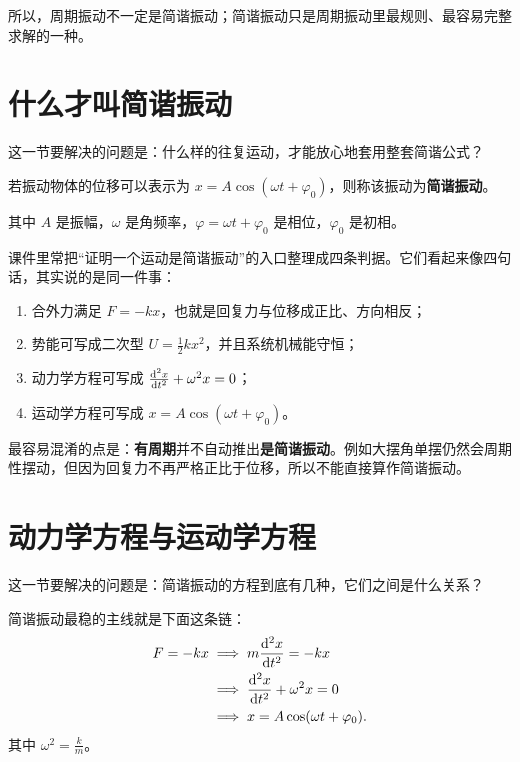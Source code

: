\documentclass[lang=cn,11pt]{elegantbook}
\begin{document}
所以，周期振动不一定是简谐振动；简谐振动只是周期振动里最规则、最容易完整求解的一种。

\section{什么才叫简谐振动}

这一节要解决的问题是：什么样的往复运动，才能放心地套用整套简谐公式？

\begin{definition}[简谐振动]\label{def:simple-harmonic-motion}
若振动物体的位移可以表示为 \(x=A\cos(\omega t+\varphi_0)\)，则称该振动为\textbf{简谐振动}。
\end{definition}

其中 \(A\) 是振幅，\(\omega\) 是角频率，\(\varphi=\omega t+\varphi_0\) 是相位，\(\varphi_0\) 是初相。

课件里常把“证明一个运动是简谐振动”的入口整理成四条判据。它们看起来像四句话，其实说的是同一件事：
\begin{enumerate}
  \item 合外力满足 \(F=-kx\)，也就是回复力与位移成正比、方向相反；
  \item 势能可写成二次型 \(U=\frac{1}{2}kx^2\)，并且系统机械能守恒；
  \item 动力学方程可写成 \(\dv[2]{x}{t}+\omega^2x=0\)；
  \item 运动学方程可写成 \(x=A\cos(\omega t+\varphi_0)\)。
\end{enumerate}

\begin{note}
最容易混淆的点是：\textbf{有周期}并不自动推出\textbf{是简谐振动}。例如大摆角单摆仍然会周期性摆动，但因为回复力不再严格正比于位移，所以不能直接算作简谐振动。
\end{note}

\section{动力学方程与运动学方程}

这一节要解决的问题是：简谐振动的方程到底有几种，它们之间是什么关系？

简谐振动最稳的主线就是下面这条链：
\begin{align*}
F=-kx &\implies m\dv[2]{x}{t}=-kx\\
      &\implies \dv[2]{x}{t}+\omega^2x=0\\
      &\implies x=A\cos(\omega t+\varphi_0).
\end{align*}
其中 \(\omega^2=\frac{k}{m}\)。
\end{document}
